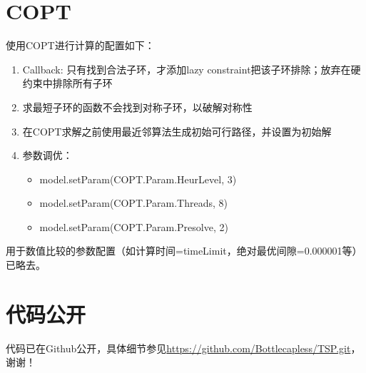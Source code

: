 \documentclass[12pt]{article}  %
\begin{document}
\section{COPT}
使用COPT进行计算的配置如下：
\begin{enumerate}
    \item Callback: 只有找到合法子环，才添加lazy constraint把该子环排除；放弃在硬约束中排除所有子环
    \item 求最短子环的函数不会找到对称子环，以破解对称性
    \item 在COPT求解之前使用最近邻算法生成初始可行路径，并设置为初始解
    \item 参数调优：
    \begin{itemize}
        \item model.setParam(COPT.Param.HeurLevel, 3)
        \item model.setParam(COPT.Param.Threads, 8)
        \item model.setParam(COPT.Param.Presolve, 2)
    \end{itemize}
\end{enumerate}
用于数值比较的参数配置（如计算时间=timeLimit，绝对最优间隙=0.000001等）已略去。

\section{代码公开}
代码已在Github公开，具体细节参见\url{https://github.com/Bottlecapless/TSP.git}，谢谢！
\end{document}
